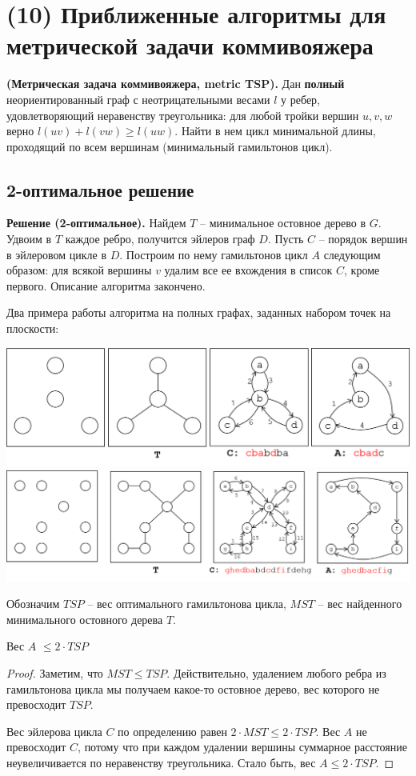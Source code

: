 \section{(10) Приближенные алгоритмы для метрической задачи коммивояжера}

\begin{problem*}\textbf{(Метрическая задача коммивояжера, metric TSP).} Дан \textbf{полный} неориентированный граф с неотрицательными весами $l$ у ребер, удовлетворяющий неравенству треугольника: для любой тройки вершин $u, v, w$ верно $l(uv) + l(vw) \geq l(uw)$. Найти в нем цикл минимальной длины, проходящий по всем вершинам (минимальный гамильтонов цикл). \end{problem*}

\subsection{2-оптимальное решение}
\textbf{Решение (2-оптимальное).} Найдем $T$ -- минимальное остовное дерево в $G$. Удвоим в $T$ каждое ребро, получится эйлеров граф $D$. Пусть $C$ -- порядок вершин в эйлеровом цикле в $D$. Построим по нему гамильтонов цикл $A$ следующим образом: для всякой вершины $v$ удалим все ее вхождения в список $C$, кроме первого. Описание алгоритма закончено.

Два примера работы алгоритма на полных графах, заданных набором точек на плоскости:

\includegraphics[width=\textwidth]{figures/ex_shorthamil.png} \\
\includegraphics[width=\textwidth]{figures/ex_longhamil.png}

Обозначим $TSP$ -- вес оптимального гамильтонова цикла, $MST$ -- вес найденного минимального остовного дерева $T$.
\begin{theorem*} Вес $A$ $\leq 2 \cdot TSP$ \end{theorem*}
\begin{proof}
Заметим, что $MST \leq TSP$. Действительно, удалением любого ребра из гамильтонова цикла мы получаем какое-то остовное дерево, вес которого не превосходит $TSP$.

Вес эйлерова цикла $C$ по определению равен $2\cdot MST \leq 2\cdot TSP$. Вес $A$ не превосходит $C$, потому что при каждом удалении вершины суммарное расстояние неувеличивается по неравенству треугольника. Стало быть, вес $A \leq 2 \cdot TSP$.
\end{proof}

